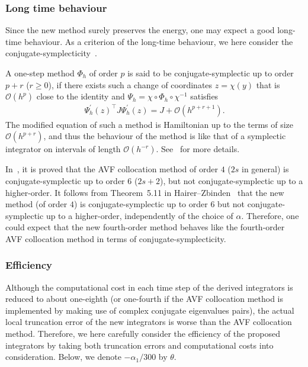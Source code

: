 \documentclass[final,leqno,onefignum,onetabnum]{siamltex1213}
\begin{document}
\subsubsection{Long time behaviour}
Since the new method surely preserves the energy,
one may expect a good long-time behaviour.
As a criterion of the long-time behaviour,
we here consider the conjugate-symplecticity~\cite{ha06}.

A one-step method $\Phi_h$ of order $p$ is said to be
conjugate-symplectic up to order $p+r$ ($r\geq 0$), if
there exists such
a change of coordinates $z=\chi (y)$
that is ${\mathcal O} (h^p)$ close to the identity and
$\Psi_h = \chi \circ \Phi_h \circ \chi^{-1}$ satisfies
\begin{align*}
\Psi_h^\prime (z)^\top J \Psi_h^\prime (z) = J + {\mathcal O} (h^{p+r+1}).
\end{align*}
The modified equation of such a method is Hamiltonian
up to the terms of size ${\mathcal O}(h^{p+r})$,
and thus the behaviour of the method is like that of a symplectic integrator
on intervals of length ${\mathcal O}(h^{-r})$.
See~\cite[Chapter~VI.8]{ha06} for more details.

In~\cite{ha10,ha13}, it is proved that
the AVF collocation method of order $4$ ($2s$ in general)
is conjugate-symplectic up to order $6$ ($2s+2$),
but not conjugate-symplectic up to a higher-order.
It follows from Theorem~5.11 in Hairer--Zbinden~\cite{ha13} that
the new method (of order $4$) is conjugate-symplectic up to order $6$
but not conjugate-symplectic up to a higher-order, independently of the choice of $\alpha$.
Therefore, one could expect that
the new fourth-order method behaves like the fourth-order AVF collocation method
in terms of conjugate-symplecticity.

\subsubsection{Efficiency}
Although the computational cost in each time step of the derived integrators
is reduced to about one-eighth
(or one-fourth if the AVF collocation method is implemented by making use of 
complex conjugate eigenvalues pairs),
the actual local truncation error of the new integrators
is worse than the AVF collocation method.
Therefore,
we here carefully consider the efficiency of the proposed integrators
by taking both truncation errors and computational costs into consideration.
Below, we denote $-\alpha_1/300$ by $\theta$.
\end{document}
